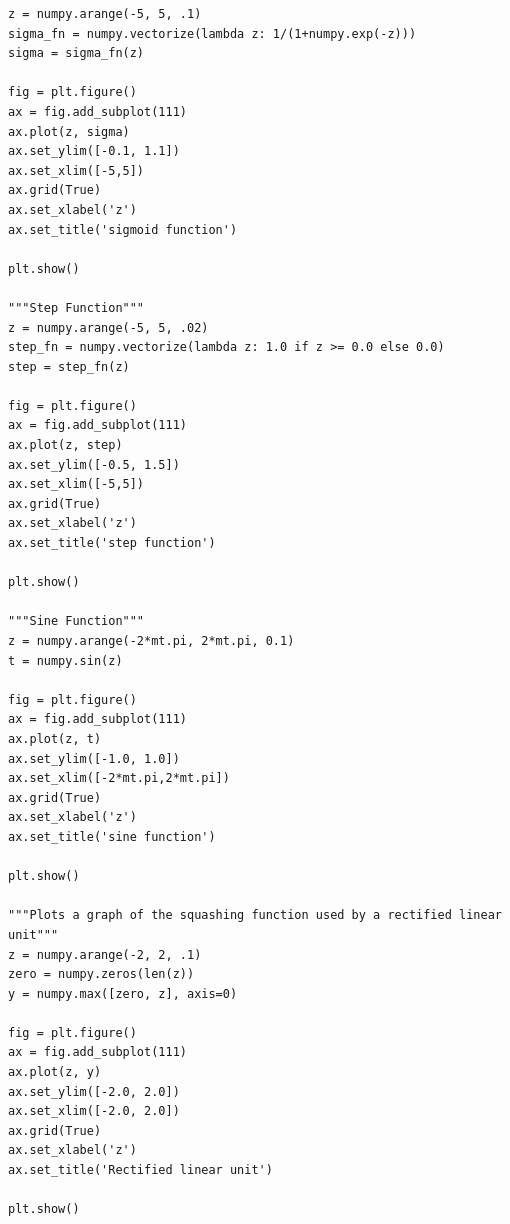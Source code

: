 \documentclass{beamer}
\begin{document}
\begin{frame}
\begin{verbatim}
z = numpy.arange(-5, 5, .1)
sigma_fn = numpy.vectorize(lambda z: 1/(1+numpy.exp(-z)))
sigma = sigma_fn(z)

fig = plt.figure()
ax = fig.add_subplot(111)
ax.plot(z, sigma)
ax.set_ylim([-0.1, 1.1])
ax.set_xlim([-5,5])
ax.grid(True)
ax.set_xlabel('z')
ax.set_title('sigmoid function')

plt.show()

"""Step Function"""
z = numpy.arange(-5, 5, .02)
step_fn = numpy.vectorize(lambda z: 1.0 if z >= 0.0 else 0.0)
step = step_fn(z)

fig = plt.figure()
ax = fig.add_subplot(111)
ax.plot(z, step)
ax.set_ylim([-0.5, 1.5])
ax.set_xlim([-5,5])
ax.grid(True)
ax.set_xlabel('z')
ax.set_title('step function')

plt.show()

"""Sine Function"""
z = numpy.arange(-2*mt.pi, 2*mt.pi, 0.1)
t = numpy.sin(z)

fig = plt.figure()
ax = fig.add_subplot(111)
ax.plot(z, t)
ax.set_ylim([-1.0, 1.0])
ax.set_xlim([-2*mt.pi,2*mt.pi])
ax.grid(True)
ax.set_xlabel('z')
ax.set_title('sine function')

plt.show()

"""Plots a graph of the squashing function used by a rectified linear
unit"""
z = numpy.arange(-2, 2, .1)
zero = numpy.zeros(len(z))
y = numpy.max([zero, z], axis=0)

fig = plt.figure()
ax = fig.add_subplot(111)
ax.plot(z, y)
ax.set_ylim([-2.0, 2.0])
ax.set_xlim([-2.0, 2.0])
ax.grid(True)
ax.set_xlabel('z')
ax.set_title('Rectified linear unit')

plt.show()

\end{verbatim}
\end{frame}
\end{document}
